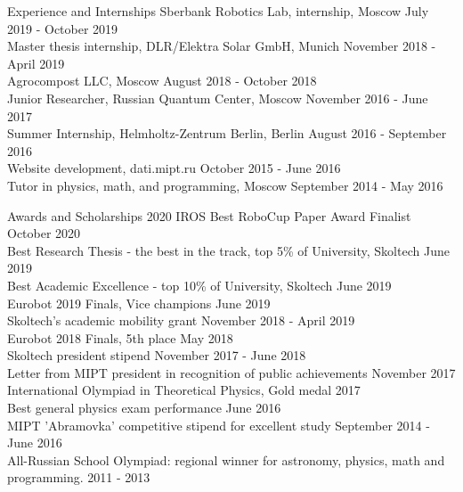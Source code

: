 \documentclass{resume} %
\begin{document}
\begin{rSection}{Experience and Internships} \itemsep -3pt  
{Sberbank Robotics Lab, internship, Moscow} \hfill July 2019 - October 2019 \\
{Master thesis internship, DLR/Elektra Solar GmbH, Munich} \hfill November 2018 - April 2019 \\ 
{Agrocompost LLC, Moscow} \hfill August 2018 - October 2018 \\
{Junior Researcher, Russian Quantum Center, Moscow} \hfill November 2016 - June 2017 \\
{Summer Internship, Helmholtz-Zentrum Berlin, Berlin} \hfill August 2016 - September 2016\\
{Website development, dati.mipt.ru} \hfill October 2015 - June 2016 \\
{Tutor in physics, math, and programming, Moscow} \hfill September 2014 - May 2016 \\
\end{rSection} 


\begin{rSection}{Awards and Scholarships} \itemsep -3pt
{2020 IROS Best RoboCup Paper Award Finalist} \hfill October 2020 \\
{Best Research Thesis - the best in the track, top 5\% of University, Skoltech} \hfill June 2019 \\
{Best Academic Excellence - top 10\% of University, Skoltech} \hfill June 2019 \\
{Eurobot 2019 Finals, Vice champions} \hfill June 2019 \\
{Skoltech's academic mobility grant} \hfill November 2018 - April 2019 \\  
{Eurobot 2018 Finals, 5th place} \hfill May 2018 \\
{Skoltech president stipend} \hfill November 2017 - June 2018 \\
{Letter from MIPT president in recognition of public achievements} \hfill November 2017\\
{International Olympiad in Theoretical Physics, Gold medal} \hfill 2017 \\
{Best general physics exam performance} \hfill June 2016 \\
{MIPT 'Abramovka' competitive stipend for excellent study} \hfill September 2014 - June 2016 \\
{All-Russian School Olympiad: regional winner for astronomy, physics, math and programming.} \hfill 2011 - 2013 \\
\end{rSection} 
\end{document}
